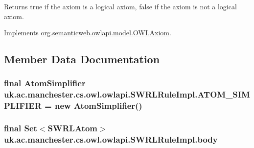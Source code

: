 \begin{DoxyReturn}{Returns}
{\ttfamily true} if the axiom is a logical axiom, {\ttfamily false} if the axiom is not a logical axiom. 
\end{DoxyReturn}


Implements \hyperlink{interfaceorg_1_1semanticweb_1_1owlapi_1_1model_1_1_o_w_l_axiom_a418ae7ad8e90290ef5b05e13ec777054}{org.\-semanticweb.\-owlapi.\-model.\-O\-W\-L\-Axiom}.



\subsection{Member Data Documentation}
\hypertarget{classuk_1_1ac_1_1manchester_1_1cs_1_1owl_1_1owlapi_1_1_s_w_r_l_rule_impl_aa745876ba7fa6e0ef29f5bb6c46215c6}{
\subsubsection[{A\-T\-O\-M\-\_\-\-S\-I\-M\-P\-L\-I\-F\-I\-E\-R}]{\setlength{\rightskip}{0pt plus 5cm}final {\bf Atom\-Simplifier} uk.\-ac.\-manchester.\-cs.\-owl.\-owlapi.\-S\-W\-R\-L\-Rule\-Impl.\-A\-T\-O\-M\-\_\-\-S\-I\-M\-P\-L\-I\-F\-I\-E\-R = new {\bf Atom\-Simplifier}()\hspace{0.3cm}{\ttfamily [protected]}}}\label{classuk_1_1ac_1_1manchester_1_1cs_1_1owl_1_1owlapi_1_1_s_w_r_l_rule_impl_aa745876ba7fa6e0ef29f5bb6c46215c6}
\hypertarget{classuk_1_1ac_1_1manchester_1_1cs_1_1owl_1_1owlapi_1_1_s_w_r_l_rule_impl_a6d430d74c0cc94fc4443853bf0f675b8}{
\subsubsection[{body}]{\setlength{\rightskip}{0pt plus 5cm}final Set$<${\bf S\-W\-R\-L\-Atom}$>$ uk.\-ac.\-manchester.\-cs.\-owl.\-owlapi.\-S\-W\-R\-L\-Rule\-Impl.\-body\hspace{0.3cm}{\ttfamily [private]}}}\label{classuk_1_1ac_1_1manchester_1_1cs_1_1owl_1_1owlapi_1_1_s_w_r_l_rule_impl_a6d430d74c0cc94fc4443853bf0f675b8}
